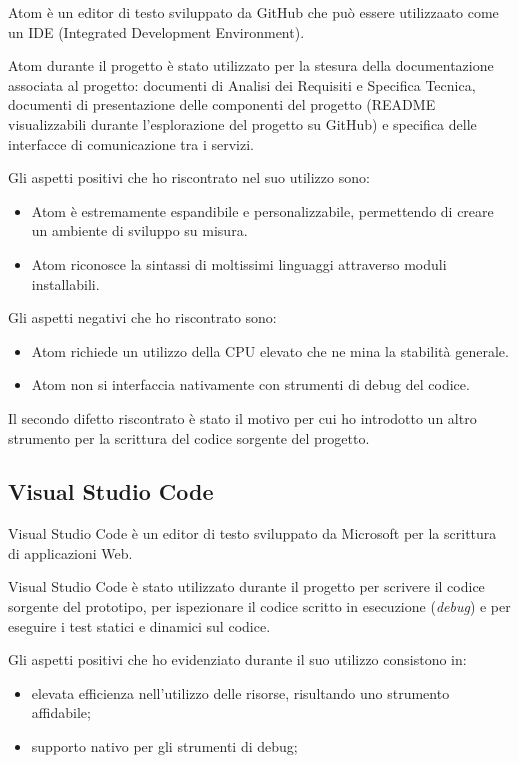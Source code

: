 Atom è un editor di testo sviluppato da GitHub che può essere utilizzaato come un IDE (Integrated Development Environment).

Atom durante il progetto è stato utilizzato per la stesura della documentazione associata al progetto: documenti di Analisi dei Requisiti e Specifica Tecnica, documenti di presentazione delle componenti del progetto (README visualizzabili durante l'esplorazione del progetto su GitHub) e specifica delle interfacce di comunicazione tra i servizi.

Gli aspetti positivi che ho riscontrato nel suo utilizzo sono:
\begin{itemize}
	\item Atom è estremamente espandibile e personalizzabile, permettendo di creare un ambiente di sviluppo su misura.
	\item Atom riconosce la sintassi di moltissimi linguaggi attraverso moduli installabili.
\end{itemize}

Gli aspetti negativi che ho riscontrato sono:
\begin{itemize}
	\item Atom richiede un utilizzo della CPU elevato che ne mina la stabilità generale.
	\item Atom non si interfaccia nativamente con strumenti di debug del codice.
\end{itemize}

Il secondo difetto riscontrato è stato il motivo per cui ho introdotto un altro strumento per la scrittura del codice sorgente del progetto.

\subsection{Visual Studio Code}

Visual Studio Code è un editor di testo sviluppato da Microsoft per la scrittura di applicazioni Web.

Visual Studio Code è stato utilizzato durante il progetto per scrivere il codice sorgente del prototipo, per ispezionare il codice scritto in esecuzione (\emph{debug}) e per eseguire i test statici e dinamici sul codice.

Gli aspetti positivi che ho evidenziato durante il suo utilizzo consistono in:
\begin{itemize}
	\item elevata efficienza nell'utilizzo delle risorse, risultando uno strumento affidabile;
	\item supporto nativo per gli strumenti di debug;
\end{itemize}

